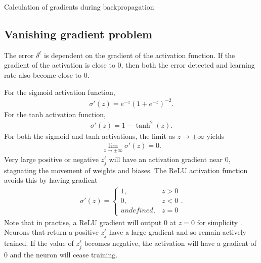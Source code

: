\begin{algorithm}[H]
\label{nnets-bprop-alg}
\SetAlgoLined
{}
\caption{Calculation of gradients during backpropagation}
\end{algorithm}




\subsection*{Vanishing gradient problem}\label{nnet-vanishinggradprob}
The error $\delta^\ell$ is dependent on the gradient of the activation function. If the gradient of the activation is close to 0, then both the error detected and learning rate also become close to 0.

\noindent For the sigmoid activation function,
\begin{align}
	\sigma '(z) = e^{-z}(1+e^{-z})^{-2}.
\end{align}
For the tanh activation function,
\begin{align}
	\sigma '(z) = 1-\tanh^2(z).
\end{align}
For both the sigmoid and tanh activations, the limit as $z\rightarrow\pm\infty$ yields 
\begin{align}
	\lim_{z\rightarrow\pm\infty}\sigma '(z)= 0.
\end{align}
Very large positive or negative $z_j^\ell$ will have an activation gradient near 0, stagnating the movement of weights and biases. The ReLU activation function avoids this by having gradient
\begin{align}
	\sigma '(z) = \begin{cases}
		1, & z > 0 \\
		0, & z < 0 \\
		undefined, & z = 0
	\end{cases}.
\end{align}
Note that in practise, a ReLU gradient will output 0 at $z = 0$ for simplicity \citep{Goodfellow-et-al-2016}. Neurons that return a positive $z_j^\ell$ have a large gradient and so remain actively trained. If the value of $z_j^\ell$ becomes negative, the activation will have a gradient of 0 and the neuron will cease training. 


